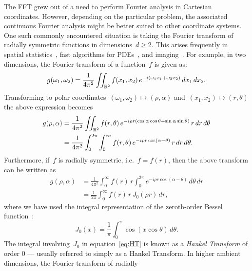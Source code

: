 The FFT grew out of a need to perform Fourier analysis in Cartesian coordinates.
However, depending on the particular problem, the associated continuous Fourier
analysis might be better suited to other coordinate systems. One such commonly
encountered situation is taking the Fourier transform of radially symmetric
functions in dimensions~$ d \geq 2$. This arises frequently in spatial
statistics~\cite{}, fast algorithms for PDEs~\cite{}, and imaging~\cite{}. For
example, in two dimensions, the Fourier transform of a function~$f$ is given as:
\begin{equation}
  g(\omega_1, \omega_2) = \frac{1}{4\pi^2} \iint_{\mathbb{R}^2} f(x_1, x_2) \, 
  e^{-i(\omega_1 x_1 + \omega_2 x_2)}  \, dx_1 \, dx_2.
\end{equation}
Transforming to polar coordinates~$(\omega_1,\omega_2) \mapsto (\rho,\alpha)$
and~$(x_1,x_2) \mapsto (r,\theta)$ the above expression becomes
\begin{equation}
  \label{eq:ftpolar}
  \begin{aligned}
    g(\rho, \alpha) &= \frac{1}{4\pi^2} \iint_{\R^2} 
    f(r,\theta) \, 
    e^{-i \rho r (\cos\alpha \cos\theta + \sin\alpha \sin\theta) } 
    \, r \, dr \, d\theta \\
  &= \frac{1}{4\pi^2} \int_0^{2\pi} \int_0^\infty f(r,\theta) \, e^{-i \rho r \cos(\alpha-\theta) } \, r \, dr \, d\theta.
  \end{aligned}
\end{equation}
Furthermore, if~$f$ is radially symmetric, i.e.~$f = f(r)$, then the above
transform can be written as
\begin{equation}
  \label{eq:HT}
  \begin{aligned}
  g(\rho,\alpha) &= \frac{1}{4\pi^2} \int_0^\infty f(r) \, r \int_0^{2\pi} 
  e^{-i \rho r \cos(\alpha - \theta) }  \, d\theta \, dr \\
  &= \frac{1}{2\pi} \int_0^\infty f(r) \, r \, J_0(\rho r)  \, dr,
  \end{aligned}
\end{equation}
where we have used the integral representation of the zeroth-order Bessel
function~\cite{olver2010nist}:
\begin{equation}
  J_0(x) = \frac{1}{\pi} \int_0^\pi \cos \left( x \cos \theta \right) \, d\theta.
\end{equation}
The integral involving~$J_0$ in equation~\eqref{eq:HT} is known as a
\emph{Hankel Transform} of order 0 --- usually referred to simply as a Hankel
Transform. In higher ambient dimensions, the Fourier transform of radially
